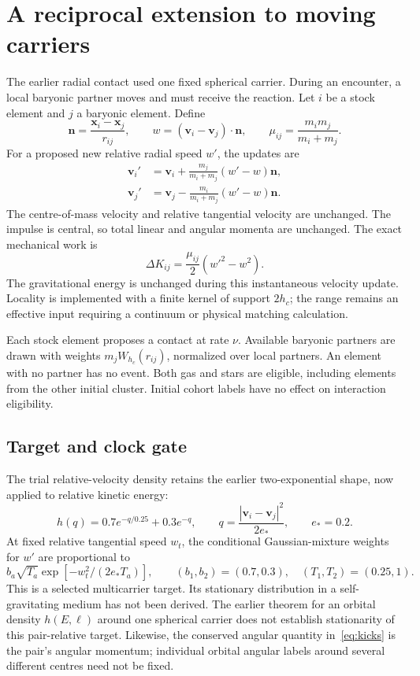 \documentclass[11pt]{article}
\begin{document}
\section{A reciprocal extension to moving carriers}
The earlier radial contact used one fixed spherical carrier. During an
encounter, a local baryonic partner moves and must receive the reaction. Let
$i$ be a stock element and $j$ a baryonic element. Define
\begin{equation}
 \mathbf n=\frac{\mathbf x_i-\mathbf x_j}{r_{ij}},\qquad
 w=(\mathbf v_i-\mathbf v_j)\cdot\mathbf n,\qquad
 \mu_{ij}=\frac{m_i m_j}{m_i+m_j}.
\end{equation}
For a proposed new relative radial speed $w'$, the updates are
\begin{align}\label{eq:kicks}
 \mathbf v_i'&=\mathbf v_i+\frac{m_j}{m_i+m_j}(w'-w)\mathbf n,\\
 \mathbf v_j'&=\mathbf v_j-\frac{m_i}{m_i+m_j}(w'-w)\mathbf n.
\end{align}
The centre-of-mass velocity and relative tangential velocity are unchanged.
The impulse is central, so total linear and angular momenta are unchanged.
The exact mechanical work is
\begin{equation}\label{eq:kinetic}
 \Delta K_{ij}=\frac{\mu_{ij}}2(w'^2-w^2).
\end{equation}
The gravitational energy is unchanged during this instantaneous velocity
update. Locality is implemented with a finite kernel of support $2h_c$;
the range remains an effective input requiring a continuum or physical
matching calculation.

Each stock element proposes a contact at rate $\nu$. Available baryonic
partners are drawn with weights $m_jW_{h_c}(r_{ij})$, normalized over local
partners. An element with no partner has no event. Both gas and stars are
eligible, including elements from the other initial cluster. Initial cohort
labels have no effect on interaction eligibility.

\subsection{Target and clock gate}
The trial relative-velocity density retains the earlier two-exponential
shape, now applied to relative kinetic energy:
\begin{equation}
 h(q)=0.7e^{-q/0.25}+0.3e^{-q},\qquad
 q=\frac{|\mathbf v_i-\mathbf v_j|^2}{2e_*},\qquad e_*=0.2.
\end{equation}
At fixed relative tangential speed $w_t$, the conditional Gaussian-mixture
weights for $w'$ are proportional to
\begin{equation}
 b_a\sqrt{T_a}\exp[-w_t^2/(2e_*T_a)],
 \qquad (b_1,b_2)=(0.7,0.3),\quad(T_1,T_2)=(0.25,1).
\end{equation}
This is a selected multicarrier target. Its stationary distribution in a
self-gravitating medium has not been derived. The earlier theorem for an
orbital density $h(E,\ell)$ around one spherical carrier does not establish
stationarity of this pair-relative target. Likewise, the conserved angular
quantity in~\eqref{eq:kicks} is the pair's angular momentum; individual
orbital angular labels around several different centres need not be fixed.
\end{document}
